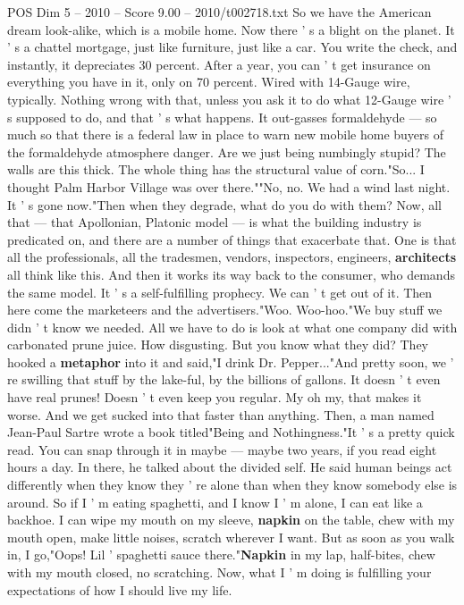 \begin{textsample}{POS Dim 5 – 2010 – Score 9.00 – 2010/t002718.txt}
So we have the American dream look-alike, which is a mobile home.
Now there ' s a blight on the planet.
It ' s a chattel mortgage, just like furniture, just like a car.
You write the check, and instantly, it depreciates 30 percent.
After a year, you can ' t get insurance on everything you have in it, only on 70 percent.
Wired with 14-Gauge wire, typically.
Nothing wrong with that, unless you ask it to do what 12-Gauge wire ' s supposed to do, and that ' s what happens.
It out-gasses formaldehyde — so much so that there is a federal law in place to warn new mobile home buyers of the formaldehyde atmosphere danger.
Are we just being numbingly stupid?
The walls are this thick.
The whole thing has the structural value of corn."So...
I thought Palm Harbor Village was over there.""No, no.
We had a wind last night.
It ' s gone now."Then when they degrade, what do you do with them?
Now, all that — that Apollonian, Platonic model — is what the building industry is predicated on, and there are a number of things that exacerbate that.
One is that all the professionals, all the tradesmen, vendors, inspectors, engineers, \textbf{architects} all think like this.
And then it works its way back to the consumer, who demands the same model.
It ' s a self-fulfilling prophecy.
We can ' t get out of it.
Then here come the marketeers and the advertisers."Woo.
Woo-hoo."We buy stuff we didn ' t know we needed.
All we have to do is look at what one company did with carbonated prune juice.
How disgusting.
But you know what they did?
They hooked a \textbf{metaphor} into it and said,"I drink Dr.
Pepper..."And pretty soon, we ' re swilling that stuff by the lake-ful, by the billions of gallons.
It doesn ' t even have real prunes!
Doesn ' t even keep you regular.
My oh my, that makes it worse.
And we get sucked into that faster than anything.
Then, a man named Jean-Paul Sartre wrote a book titled"Being and Nothingness."It ' s a pretty quick read.
You can snap through it in maybe — maybe two years, if you read eight hours a day.
In there, he talked about the divided self.
He said human beings act differently when they know they ' re alone than when they know somebody else is around.
So if I ' m eating spaghetti, and I know I ' m alone, I can eat like a backhoe.
I can wipe my mouth on my sleeve, \textbf{napkin} on the table, chew with my mouth open, make little noises, scratch wherever I want.
But as soon as you walk in, I go,"Oops!
Lil ' spaghetti sauce there."\textbf{Napkin} in my lap, half-bites, chew with my mouth closed, no scratching.
Now, what I ' m doing is fulfilling your expectations of how I should live my life.

\end{textsample}
